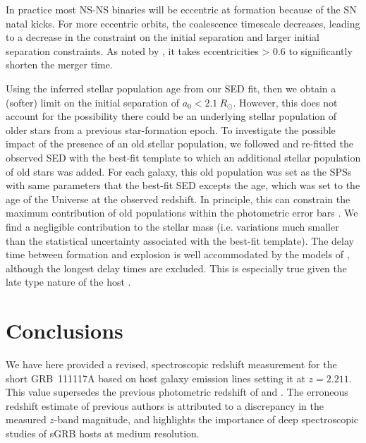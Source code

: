 \documentclass{aa}    %
\begin{document}
In practice most NS-NS binaries will be eccentric at formation because of the SN
natal kicks. For more eccentric orbits, the coalescence timescale decreases,
leading to a decrease in the constraint on the initial separation and larger
initial separation constraints. As noted by \citet{Postnov2014}, it takes
eccentricities > 0.6 to significantly shorten the merger time.

Using the inferred stellar population age from our SED fit, then we obtain a
(softer) limit on the initial separation of $a_0 < 2.1~R_\odot$. However, this
does not account for the possibility there could be an underlying stellar
population of older stars from a previous star-formation epoch. To investigate
the possible impact of the presence of an old stellar population, we followed
\citet{Papovich2001} and re-fitted the observed SED with the best-fit template
to which an additional stellar population of old stars was added. For each
galaxy, this old population was set as the SPSs with same parameters that the
best-fit SED excepts the age, which was set to the age of the Universe at the
observed redshift. In principle, this can constrain the maximum contribution of
old populations within the photometric error bars \citep[see][ for
details]{Papovich2001}. We find a negligible contribution to the stellar mass
(i.e. variations much smaller than the statistical uncertainty associated with
the best-fit template). The delay time between formation and explosion is well
accommodated by the models of \citet{Belczynski2006}, although the longest delay
times are excluded. This is especially true given the late type nature of the
host \citep{OShaughnessy2008}.

\section{Conclusions}

We have here provided a revised, spectroscopic redshift measurement for the
short GRB~111117A based on host galaxy emission lines setting it at $z = 2.211$.
This value supersedes the previous photometric redshift of \citet{Margutti2012}
and \citet{Sakamoto2013}. The erroneous redshift estimate of previous authors is
attributed to a discrepancy in the measured $z$-band magnitude, and highlights
the importance of deep spectroscopic studies of sGRB hosts at medium resolution.
\end{document}
